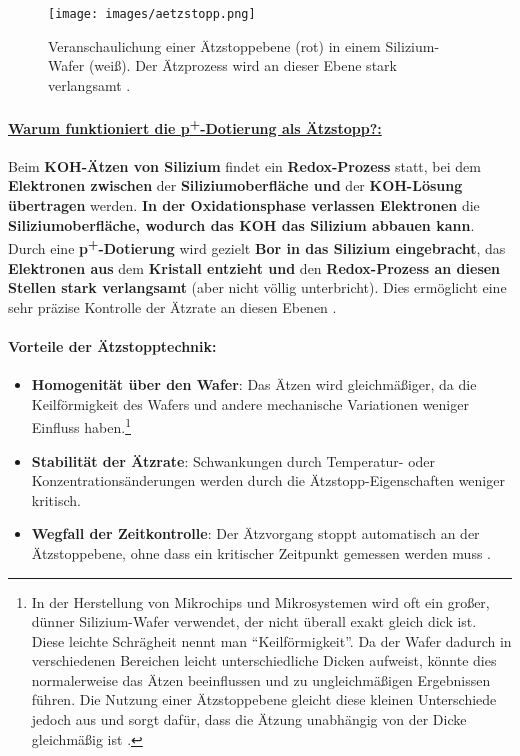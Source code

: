 \documentclass{article} %
\begin{document}
\begin{figure}[htb!]
    \centering
    \texttt{[image: images/aetzstopp.png]} %
    \captionsetup{labelfont=bf, width=.85\textwidth} %
    \caption{Veranschaulichung einer Ätzstoppebene (rot) in einem Silizium-Wafer (weiß). Der Ätzprozess wird an dieser Ebene stark verlangsamt \cite{schmid2024Aetzen}.}
    \label{fig:aetzstopp}
\end{figure}

\paragraph{\uline{Warum funktioniert die p\textsuperscript{+}-Dotierung als Ätzstopp?:}} Beim \textbf{KOH-Ätzen von Silizium} findet ein \textbf{Redox-Prozess} statt, bei dem \textbf{Elektronen zwischen} der \textbf{Siliziumoberfläche und} der \textbf{KOH-Lösung übertragen} werden. \textbf{In der Oxidationsphase verlassen Elektronen} die \textbf{Siliziumoberfläche, wodurch das KOH das Silizium abbauen kann}. Durch eine \textbf{\textbf{p\textsuperscript{+}-Dotierung}} wird gezielt \textbf{Bor in das Silizium eingebracht}, das \textbf{Elektronen aus} dem \textbf{Kristall entzieht und} den \textbf{Redox-Prozess an diesen Stellen stark verlangsamt} (aber nicht völlig unterbricht). Dies ermöglicht eine sehr präzise Kontrolle der Ätzrate an diesen Ebenen \cite{seidel1990, madou2002}.

\paragraph{Vorteile der Ätzstopptechnik:}
\begin{itemize}
    \item \textbf{Homogenität über den Wafer}: Das Ätzen wird gleichmäßiger, da die Keilförmigkeit des Wafers und andere mechanische Variationen weniger Einfluss haben.\footnote{In der Herstellung von Mikrochips und Mikrosystemen wird oft ein großer, dünner Silizium-Wafer verwendet, der nicht überall exakt gleich dick ist. Diese leichte Schrägheit nennt man ``Keilförmigkeit''. Da der Wafer dadurch in verschiedenen Bereichen leicht unterschiedliche Dicken aufweist, könnte dies normalerweise das Ätzen beeinflussen und zu ungleichmäßigen Ergebnissen führen. Die Nutzung einer Ätzstoppebene gleicht diese kleinen Unterschiede jedoch aus und sorgt dafür, dass die Ätzung unabhängig von der Dicke gleichmäßig ist \cite{madou2002}.}
    \item \textbf{Stabilität der Ätzrate}: Schwankungen durch Temperatur- oder Konzentrationsänderungen werden durch die Ätzstopp-Eigenschaften weniger kritisch.
    \item \textbf{Wegfall der Zeitkontrolle}: Der Ätzvorgang stoppt automatisch an der Ätzstoppebene, ohne dass ein kritischer Zeitpunkt gemessen werden muss \cite{madou2002}.
\end{itemize}
\end{document}
